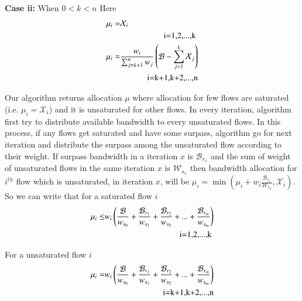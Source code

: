 {\bf Case ii:} When $0<k<n$
Here
\begin{equation}
\label{eqn:case3-1}
\begin{split}
\mu_i =& \mathcal{X}_i \\ & \omit\hfill \text{} i=1,2,...,k \\
\mu_i =& \frac{w_i}{\sum_{j=k+1}^{n} w_j} \left(\mathcal{B}-\sum_{j=1}^{k}\mathcal{X}_j\right) \\ & \omit\hfill \text{} i=k+1,k+2,...,n\\
\end{split}
\end{equation}

Our algorithm returns allocation $\mu$ where allocation for few flows are saturated (i.e. $\mu_i = \mathcal{X}_i$) and it is unsaturated for other flows. In every iteration, algorithm first try to distribute available bandwidth to every unsaturated flows. In this process, if any flows get saturated and have some surpass, algorithm go for next iteration and distribute the surpass among the unsaturated flow according to their weight. If surpass bandwidth in a iteration $x$ is $\mathcal{B}_{r_x}$ and the sum of weight of unsaturated flows in the same iteration $x$ is $\mathcal{W}_{s_x}$ then bandwidth allocation for $i^{th}$ flow which is unsaturated, in iteration $x$, will be $\mu_i = \min\left( \mu_i + w_i\frac{\mathcal{B}_{r_x}}{\mathcal{W}_{s_x}}, \mathcal{X}_i \right)$. So we can write that for a saturated flow $i$ 
\begin{equation}
\label{eqn:case3-2}
\begin{split}
\mu_i \le& w_i \left( \frac{\mathcal{B}}{w_{s_0}} + \frac{\mathcal{B}_{r_1}}{w_{s_1}} + \frac{\mathcal{B}_{r_2}}{w_{s_2}} + ... + \frac{\mathcal{B}_{r_m}}{w_{s_m}} \right) \\ 
& \omit\hfill \text{} i=1,2,...,k \\
\end{split}
\end{equation}

For a unsaturated flow $i$
\begin{equation}
\label{eqn:case3-3}
\begin{split}
\mu_i =& w_i \left( \frac{\mathcal{B}}{w_{s_0}} + \frac{\mathcal{B}_{r_1}}{w_{s_1}} + \frac{\mathcal{B}_{r_2}}{w_{s_2}} + ... + \frac{\mathcal{B}_{r_m}}{w_{s_m}} \right) 
\\ & \omit\hfill \text{} i=k+1,k+2,...,n\\
\end{split}
\end{equation}


